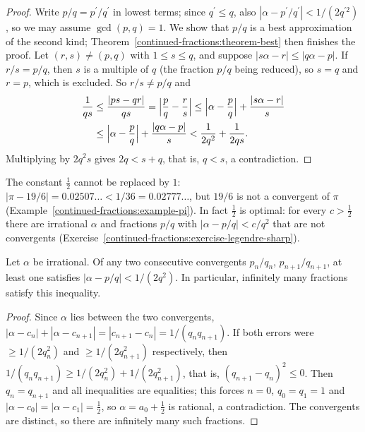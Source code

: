 \begin{proof}
Write $p/q = p^{\prime}/q^{\prime}$ in lowest terms; since $q^{\prime} \leq q$, also $|\alpha - p^{\prime}/q^{\prime}| < 1/(2q^{\prime 2})$, so we may assume $\gcd(p, q) = 1$. We show that $p/q$ is a
best approximation of the second kind; Theorem~\ref{continued-fractions:theorem-best} then finishes the proof. Let $(r, s) \neq (p, q)$ with $1 \leq s \leq q$, and suppose
$|s\alpha - r| \leq |q\alpha - p|$. If $r/s = p/q$, then $s$ is a multiple of $q$ (the fraction $p/q$ being reduced), so $s = q$ and $r = p$, which is excluded. So $r/s \neq p/q$ and
\[
\begin{aligned}
\frac{1}{qs} &\leq \frac{|ps - qr|}{qs} = \Bigl|\frac pq - \frac rs\Bigr| \leq \Bigl|\alpha - \frac pq\Bigr| + \frac{|s\alpha - r|}{s}\\
&\leq \Bigl|\alpha - \frac pq\Bigr| + \frac{|q\alpha - p|}{s} < \frac{1}{2q^2} + \frac{1}{2qs}.
\end{aligned}
\]
Multiplying by $2q^2s$ gives $2q < s + q$, that is, $q < s$, a contradiction.
\end{proof}

\begin{counterexample}\label{continued-fractions:counterexample-legendre}
The constant $\frac12$ cannot be replaced by $1$: $|\pi - 19/6| = 0.02507\ldots < 1/36 = 0.02777\ldots$, but $19/6$ is not a convergent of $\pi$ (Example~\ref{continued-fractions:example-pi}). In fact
$\frac12$ is optimal: for every $c > \frac12$ there are irrational $\alpha$ and fractions $p/q$ with $|\alpha - p/q| < c/q^2$ that are not convergents (Exercise~\ref{continued-fractions:exercise-legendre-sharp}).
\end{counterexample}

\begin{proposition}[Vahlen]\label{continued-fractions:proposition-vahlen}
Let $\alpha$ be irrational. Of any two consecutive convergents $p_n/q_n$, $p_{n+1}/q_{n+1}$, at least one satisfies $|\alpha - p/q| < 1/(2q^2)$. In particular, infinitely many fractions satisfy
this inequality.
\end{proposition}

\begin{proof}
Since $\alpha$ lies between the two convergents, $|\alpha - c_n| + |\alpha - c_{n+1}| = |c_{n+1} - c_n| = 1/(q_nq_{n+1})$. If both errors were $\geq 1/(2q_n^2)$ and $\geq 1/(2q_{n+1}^2)$
respectively, then $1/(q_nq_{n+1}) \geq 1/(2q_n^2) + 1/(2q_{n+1}^2)$, that is, $(q_{n+1} - q_n)^2 \leq 0$. Then $q_n = q_{n+1}$ and all inequalities are equalities; this forces $n = 0$,
$q_0 = q_1 = 1$ and $|\alpha - c_0| = |\alpha - c_1| = \frac12$, so $\alpha = a_0 + \frac12$ is rational, a contradiction. The convergents are distinct, so there are infinitely many such fractions.
\end{proof}

